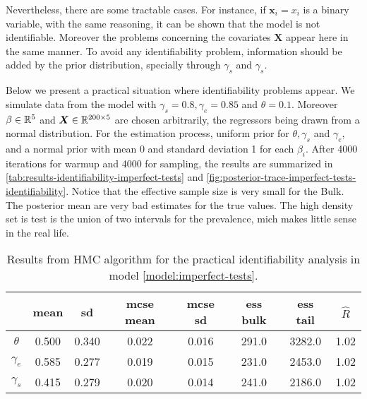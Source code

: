 Nevertheless, there are some tractable cases. For instance, if $\boldsymbol{x}_i = x_i$ is a binary variable, with the same
reasoning, it can be shown that the model is not identifiable. Moreover the
problems concerning the covariates $\boldsymbol{X}$ appear here in the same
manner. To avoid any identifiability problem, information should be added by
the prior distribution, specially through $\gamma_s$ and $\gamma_s$.

Below we present a practical situation where identifiability problems appear.
We simulate data from the model with $\gamma_s = 0.8, \gamma_e = 0.85$ and
$\theta = 0.1$. Moreover $\beta \in \mathbb{R}^5$ and $\boldsymbol{X} \in \mathbb{R}^{200
    \times 5}$ are chosen arbitrarily, the regressors being drawn from a normal
distribution. For the estimation process, uniform prior for $\theta, \gamma_s$
and $\gamma_e$, and a normal prior with mean 0 and standard deviation 1 for
each $\beta_i$. After 4000 iterations for warmup and 4000 for sampling, the
results are summarized in
\autoref{tab:results-identifiability-imperfect-tests}
and \autoref{fig:posterior-trace-imperfect-tests-identifiability}. Notice that
the effective sample size is very small for the Bulk. The posterior mean are
very bad estimates for the true values. The high density set is test is the
union of two intervals for the prevalence, mich makes little sense in the real
life.

\begin{table}[tbp]
  \centering
  \caption{\label{tab:results-identifiability-imperfect-tests}Results from HMC
    algorithm for the practical identifiability analysis in model \eqref{model:imperfect-tests}.}
  \begin{tabular}{cccccccc}
    \hline
    \textbf{}        & \textbf{mean}     & \textbf{sd}       & \textbf{mcse mean} &
    \textbf{mcse sd} & \textbf{ess bulk} & \textbf{ess tail} &
    \textbf{$\hat{R}$}                                                                                            \\ \hline
    $\theta$         & 0.500             & 0.340             & 0.022              & 0.016 & 291.0 & 3282.0 & 1.02 \\
    $\gamma_e$       & 0.585             & 0.277             & 0.019              & 0.015 & 231.0 & 2453.0 & 1.02 \\
    $\gamma_s$       & 0.415             & 0.279             & 0.020              & 0.014 & 241.0 & 2186.0 & 1.02 \\ \hline
  \end{tabular}
\end{table}

